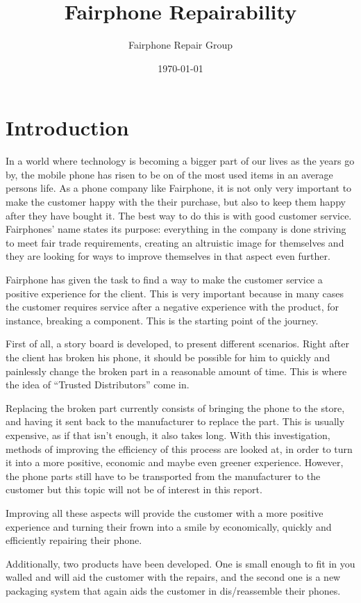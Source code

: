 \documentclass[final,a4paper]{report} %
\author{Fairphone Repair Group}
\title{Fairphone Repairability}
\date{\today}
\begin{document}
\chapter{Introduction}
\label{ch:introduction}
In a world where technology is becoming a bigger part of our lives as the years go by, the mobile phone has risen to be on of the most used items in an average persons life. As a phone company like Fairphone, it is not only very important to make the customer happy with the their purchase, but also to keep them happy after they have bought it. The best way to do this is with good customer service. Fairphones' name states its purpose: everything in the company is done striving to meet fair trade requirements, creating an altruistic image for themselves and they are looking for ways to improve themselves in that aspect even further.

Fairphone has given the task to find a way to make the customer service a positive experience for the client. This is very important because in many cases the customer requires service after a negative experience with the product, for instance, breaking a component. This is the starting point of the journey.

First of all, a story board is developed, to present different scenarios. Right after the client has broken his phone, it should be possible for him to quickly and painlessly change the broken part in a reasonable amount of time. This is where the idea of ``Trusted Distributors'' come in. 

Replacing the broken part currently consists of bringing the phone to the store, and having it sent back to the manufacturer to replace the part. This is usually expensive, as if that isn't enough, it also takes long. With this investigation, methods of improving the efficiency of this process are looked at, in order to turn it into a more positive, economic and maybe even greener experience. However, the phone parts still have to be transported from the manufacturer to the customer but this topic will not be of interest in this report.

Improving all these aspects will provide the customer with a more positive experience and turning their frown into a smile by economically, quickly and efficiently repairing their phone.

Additionally, two products have been developed. One is small enough to fit in you walled and will aid the customer with the repairs, and the second one is a new packaging system that again aids the customer in dis/reassemble their phones.
\end{document}
